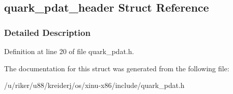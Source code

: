 \hypertarget{structquark__pdat__header}{}\subsection{quark\+\_\+pdat\+\_\+header Struct Reference}
\label{structquark__pdat__header}


\subsubsection{Detailed Description}


Definition at line 20 of file quark\+\_\+pdat.\+h.



The documentation for this struct was generated from the following file\+:\begin{DoxyCompactItemize}
\item 
/u/riker/u88/kreiderj/os/xinu-\/x86/include/quark\+\_\+pdat.\+h\end{DoxyCompactItemize}
